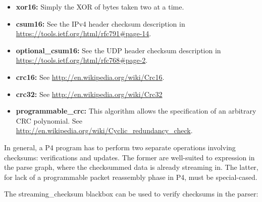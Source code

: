 \documentclass[12pt]{article}
\begin{document}
\begin{itemize}
\item
\textbf{xor16:} Simply the XOR of bytes taken two at a time.
\item
\textbf{csum16:}  See the IPv4 header checksum description in \\
\url{https://tools.ietf.org/html/rfc791\#page-14}.
\item
\textbf{optional_csum16:}  See the UDP header checksum description in \\
\url{https://tools.ietf.org/html/rfc768#page-2}.
\item
\textbf{crc16:} See \url{http://en.wikipedia.org/wiki/Crc16}.
\item
\textbf{crc32:} See \url{http://en.wikipedia.org/wiki/Crc32}
\item
\textbf{programmable_crc:}  This algorithm allows the specification 
of an arbitrary CRC polynomial.  See
\url{http://en.wikipedia.org/wiki/Cyclic_redundancy_check}.
\end{itemize}


In general, a P4 program has to perform two separate operations involving
checksums: verifications and updates. The former are well-suited to expression
in the parse graph, where the checksummed data is already streaming in. The
latter, for lack of a programmable packet reassembly phase in P4, must be
special-cased.

The streaming_checksum blackbox can be used to verify checksums in the parser:
\end{document}
